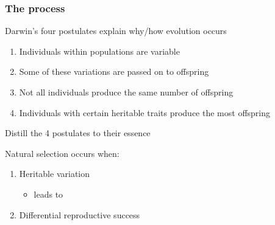 \begin{frame}
    \frametitle{The process}

    Darwin’s four postulates explain why/how evolution occurs

    \begin{enumerate}
        \item<2-> Individuals within populations are variable
            \vspace{1cm}

        \item<2-> Some of these variations are passed on to offspring
            \vspace{1cm}

        \item<2-> Not all individuals produce the same number of offspring
            \vspace{1cm}

        \item<2-> Individuals with certain heritable traits produce the most
            offspring
    \end{enumerate}

\end{frame}

\begin{frame}
    Distill the 4 postulates to their essence
    \vspace{0.5cm}

    Natural selection occurs when:
    \vspace{0.5cm}

    \begin{enumerate}
        \item<2-> Heritable variation
        \vspace{0.5cm}

        \begin{itemize}
            \item<3-> leads to
        \end{itemize}

        \vspace{0.5cm}
        \item<4-> Differential reproductive success 
    \end{enumerate}

    \vspace{0.5cm}

\end{frame}

